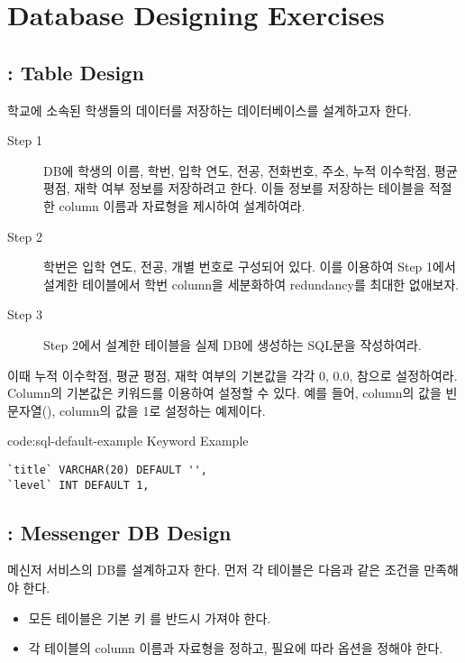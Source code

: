 \section{Database Designing Exercises}\label{sect:db-designing-exercises}

\subsection*{:  Table Design}

학교에 소속된 학생들의 데이터를 저장하는 데이터베이스를 설계하고자 한다.

\begin{description}
    \item[Step 1] DB에 학생의 이름, 학번, 입학 연도, 전공, 전화번호, 주소, 누적 이수학점, 평균 평점, 재학 여부 정보를 저장하려고 한다. 이들 정보를 저장하는 테이블을 적절한 column 이름과 자료형을 제시하여 설계하여라.
    \item[Step 2] 학번은 입학 연도, 전공, 개별 번호로 구성되어 있다. 이를 이용하여 Step 1에서 설계한 테이블에서 학번 column을 세분화하여 redundancy를 최대한 없애보자.
    \item[Step 3] Step 2에서 설계한 테이블을 실제 DB에 생성하는 SQL문을 작성하여라.
\end{description}

이때 누적 이수학점, 평균 평점, 재학 여부의 기본값을 각각 0, 0.0, 참으로 설정하여라. Column의 기본값은  키워드를 이용하여 설정할 수 있다. 예를 들어, \은  column의 값을 빈 문자열(),  column의 값을 1로 설정하는 예제이다.

\begin{codeenv}{code:sql-default-example}{ Keyword Example}\begin{verbatim}
`title` VARCHAR(20) DEFAULT '',
`level` INT DEFAULT 1,
\end{verbatim}
\end{codeenv}

\subsection*{: Messenger DB Design}

메신저 서비스의 DB를 설계하고자 한다. 먼저 각 테이블은 다음과 같은 조건을 만족해야 한다.

\begin{itemize}
    \item 모든 테이블은 기본 키 를 반드시 가져야 한다.
    \item 각 테이블의 column 이름과 자료형을 정하고, 필요에 따라 옵션을 정해야 한다.
\end{itemize}

